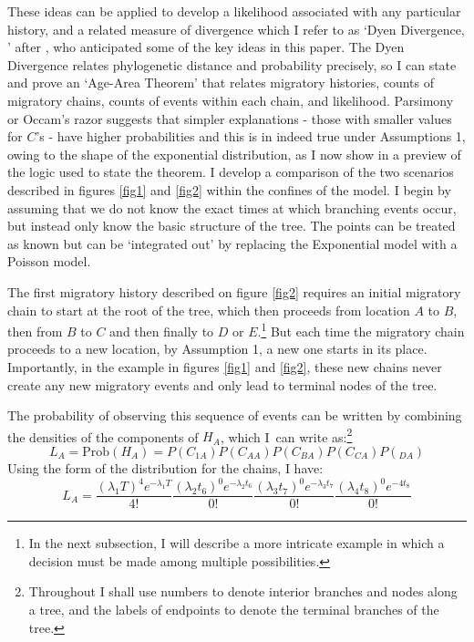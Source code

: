 \documentclass[11pt]{article}
\begin{document}
These ideas can be applied to develop a likelihood associated with any particular history, and a related measure of divergence which I refer to as `Dyen Divergence, ' after \cite{dyen56}, who anticipated some of the key ideas in this paper. The Dyen Divergence relates phylogenetic distance and probability precisely, so I  can state and prove an `Age-Area Theorem' that relates  migratory histories, counts of migratory chains, counts of events within each chain, and likelihood. Parsimony or Occam's razor suggests that simpler explanations - those with smaller values for $C$'s - have higher probabilities and this is in indeed true under Assumptions 1, owing to the shape of the exponential distribution, as I now show in a preview of the logic used to state the theorem.
 I  develop a comparison of the two scenarios described in figures \ref{fig1} and \ref{fig2} within the confines of the model. I begin by assuming that we do not know the exact times at which branching events occur, but instead only know the basic structure of the tree. The points can be treated as known but can be `integrated out' by replacing the Exponential model with a Poisson model. 

The first migratory history described on figure \ref{fig2} requires an initial migratory chain to start at the root of the tree, which then proceeds from location $A$ to $B$, then from $B$ to $C$ and then finally to $D$ or $E$.\footnote{In the next subsection, I will describe a more intricate example in which a decision must be made among multiple possibilities.} But each time the migratory chain proceeds to a new location, by Assumption 1, a new one starts in its place. Importantly, in the example in figures \ref{fig1} and \ref{fig2}, these new chains never create any new migratory events and only lead to terminal nodes of the tree. 

The probability of observing this sequence of events can be written by combining the densities of the components of  $H_A$, which I\ can write as:\footnote{Throughout I shall use numbers to denote interior branches and nodes along a tree, and the labels of endpoints to denote the terminal branches of the tree.}
\begin{equation*}
L_A=\textrm{Prob}(H_A)=P(C_{1A})P(C_{AA})P(C_{BA})P(C_{CA})P(_{DA})
\end{equation*}
Using the form of the distribution for the chains, I have:
\begin{equation} \label{e1}
L_A = \frac{(\lambda_1 T)^4e^{-\lambda_1T}}{4!}\frac{(\lambda_2 t_6)^0e^{-\lambda_2t_6}}{0!}\frac{(\lambda_3 t_7)^0e^{-\lambda_3t_7}}{0!}\frac{(\lambda_4 t_8)^0e^{-4t_8}}{0!}
\end{equation} 
\end{document}
